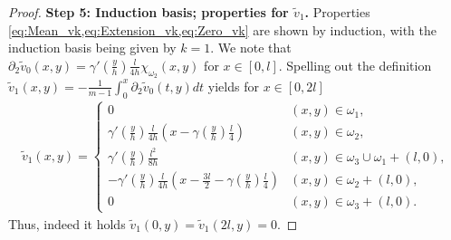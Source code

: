 \documentclass[a4paper, 10pt, twoside, notitlepage]{amsart}
\theoremstyle{plain}
\newcommand{\p}{\partial}
\begin{document}
\begin{proof}
                        
                          \textbf{Step 5: Induction basis; properties for $\tilde{v}_1$.}
                           Properties \cref{eq:Mean_vk,eq:Extension_vk,eq:Zero_vk} are shown by induction, with the induction basis being given by $k=1$.
                          We note that $\p_2 \tilde{v}_0(x,y) = \gamma'(\frac{y}{h}) \frac{l}{4h} \chi_{\omega_2}(x,y)$ for $x \in [0,l]$.
                          Spelling out the definition $\tilde{v}_1(x,y)= - \frac{1}{m-1} \int_0^x \p_2 \tilde{v}_0(t,y) dt$ yields for $x \in [0,2l]$
                          \begin{align*}
                            \tilde{v}_1(x,y) = \begin{cases} 0 & (x,y) \in \omega_1, \\ \gamma'(\frac{y}{h}) \frac{l}{4h} (x-\gamma(\frac{y}{h}) \frac{l}{4}) & (x,y) \in \omega_2, \\ \gamma'(\frac{y}{h}) \frac{l^2}{8h} & (x,y) \in \omega_3 \cup \omega_1 + (l,0), \\
                                                 - \gamma'(\frac{y}{h}) \frac{l}{4h}(x-\frac{3l}{2}-\gamma(\frac{y}{h})\frac{l}{4}) & (x,y) \in \omega_2 + (l,0), \\
                                                 0 & (x,y) \in \omega_3+(l,0).
                                               \end{cases}
                          \end{align*}
                          Thus, indeed it holds $\tilde{v}_1(0,y) = \tilde{v}_1(2l,y) = 0$.
                        


\end{proof}
\end{document}
